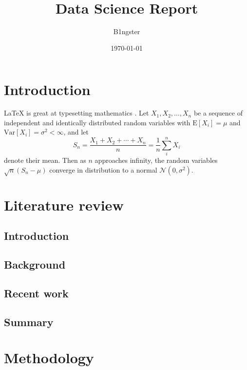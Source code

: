 \documentclass{article}
\title{Data Science Report }
\author{B1ngster}
\date{\today}
\begin{document}
\maketitle
\newpage

\begin{abstract}

\end{abstract}


\newpage
\tableofcontents
\newpage


 \section{Introduction}

\LaTeX{} is great at typesetting mathematics \cite{Bond2014}. Let $X_1, X_2, \ldots, X_n$ be a sequence of independent and identically distributed random variables with $\text{E}[X_i] = \mu$ and $\text{Var}[X_i] = \sigma^2 < \infty$, and let
$$S_n = \frac{X_1 + X_2 + \cdots + X_n}{n}
      = \frac{1}{n}\sum_{i}^{n} X_i$$
denote their mean. Then as $n$ approaches infinity, the random variables $\sqrt{n}(S_n - \mu)$ converge in distribution to a normal $\mathcal{N}(0, \sigma^2)$.
\newpage

\section{Literature review} %
    \subsection{Introduction}
	
	
	\subsection{Background}

	\subsection{Recent work}
	\subsection{Summary}


\section{Methodology} 
\end{document}
